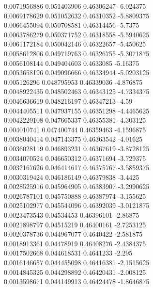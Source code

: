 {0.0071956886 0.051403906 0.46306247 -6.024375\\
0.0069178629 0.051052632 0.46310352 -5.8809375\\
0.0066455094 0.050708581 0.46314456 -5.7375\\
0.0063786279 0.050371752 0.46318558 -5.5940625\\
0.0061172184 0.050042146 0.46322657 -5.450625\\
0.0058612806 0.049719763 0.46326755 -5.3071875\\
0.0056108144 0.049404603 0.4633085 -5.16375\\
0.0053658196 0.049096666 0.46334944 -5.0203125\\
0.005126296 0.048795953 0.46339036 -4.876875\\
0.0048922435 0.048502463 0.46343125 -4.7334375\\
0.0046636619 0.048216197 0.46347213 -4.59\\
0.0044405511 0.047937155 0.46351298 -4.4465625\\
0.0042229108 0.047665337 0.46355381 -4.303125\\
0.004010741 0.047400744 0.46359463 -4.1596875\\
0.0038040414 0.047143375 0.46363542 -4.01625\\
0.0036028119 0.046893231 0.46367619 -3.8728125\\
0.0034070524 0.046650312 0.46371694 -3.729375\\
0.0032167626 0.046414617 0.46375767 -3.5859375\\
0.0030319424 0.046186149 0.46379838 -3.4425\\
0.0028525916 0.045964905 0.46383907 -3.2990625\\
0.0026787101 0.045750888 0.46387974 -3.155625\\
0.0025102977 0.045544096 0.46392039 -3.0121875\\
0.0023473543 0.04534453 0.46396101 -2.86875\\
0.0021898797 0.04515219 0.46400161 -2.7253125\\
0.0020378736 0.044967077 0.4640422 -2.581875\\
0.0018913361 0.04478919 0.46408276 -2.4384375\\
0.0017502668 0.044618531 0.4641233 -2.295\\
0.0016146657 0.044455098 0.46416381 -2.1515625\\
0.0014845325 0.044298892 0.46420431 -2.008125\\
0.0013598671 0.044149913 0.46424478 -1.8646875\\
}
